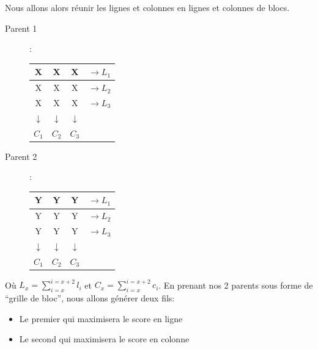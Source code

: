                     Nous allons alors réunir les lignes et colonnes en lignes et colonnes de blocs.
                    \begin{description}
                        \item[Parent 1]:\\
                            \begin{center}
                                \begin{tabular}{|c|c|c| |l}
                                    \hline
                                    X&X&X&$\rightarrow L_1$\\
                                    \hline
                                    X&X&X&$\rightarrow L_2$\\
                                    \hline
                                    X&X&X&$\rightarrow L_3$\\
                                    \hline
                                    \hline
                                    $\downarrow$&$\downarrow$&$\downarrow$&\\
                                    $C_1$&$C_2$&$C_3$&\\
                                \end{tabular}
                            \end{center}
                        \item[Parent 2]:\\
                            \begin{center}
                                \begin{tabular}{|c|c|c| |l}
                                    \hline
                                    Y&Y&Y&$\rightarrow L_1$\\
                                    \hline
                                    Y&Y&Y&$\rightarrow L_2$\\
                                    \hline
                                    Y&Y&Y&$\rightarrow L_3$\\
                                    \hline
                                    \hline
                                    $\downarrow$&$\downarrow$&$\downarrow$&\\
                                    $C_1$&$C_2$&$C_3$&\\
                                \end{tabular}
                            \end{center}
                    \end{description}
                    Où $L_x=\sum_{i=x}^{i=x+2}l_i$ et $C_x=\sum_{i=x}^{i=x+2}c_i$.
                    En prenant nos 2 parents sous forme de ``grille de bloc'', nous allons générer deux fils:
                    \begin{itemize}
                        \item Le premier qui maximisera le score en ligne
                        \item Le second qui maximisera le score en colonne
                    \end{itemize}

